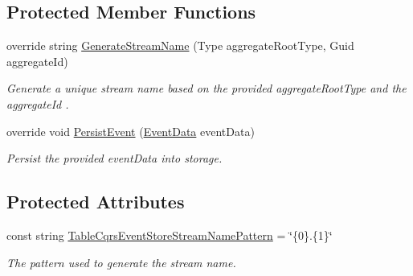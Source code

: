 \subsection*{Protected Member Functions}
\begin{DoxyCompactItemize}
\item 
override string \hyperlink{classCqrs_1_1Azure_1_1BlobStorage_1_1Events_1_1TableStorageEventStore_a5cee1f388c1a03d9cfea5ee1a9f42657_a5cee1f388c1a03d9cfea5ee1a9f42657}{Generate\+Stream\+Name} (Type aggregate\+Root\+Type, Guid aggregate\+Id)
\begin{DoxyCompactList}\small\item\em Generate a unique stream name based on the provided {\itshape aggregate\+Root\+Type}  and the {\itshape aggregate\+Id} . \end{DoxyCompactList}\item 
override void \hyperlink{classCqrs_1_1Azure_1_1BlobStorage_1_1Events_1_1TableStorageEventStore_ae63921d0ace265b1b269c865080b5712_ae63921d0ace265b1b269c865080b5712}{Persist\+Event} (\hyperlink{classCqrs_1_1Events_1_1EventData}{Event\+Data} event\+Data)
\begin{DoxyCompactList}\small\item\em Persist the provided {\itshape event\+Data}  into storage. \end{DoxyCompactList}\end{DoxyCompactItemize}
\subsection*{Protected Attributes}
\begin{DoxyCompactItemize}
\item 
const string \hyperlink{classCqrs_1_1Azure_1_1BlobStorage_1_1Events_1_1TableStorageEventStore_a6e64df5250bd136250259e0a573097e4_a6e64df5250bd136250259e0a573097e4}{Table\+Cqrs\+Event\+Store\+Stream\+Name\+Pattern} = \char`\"{}\{0\}.\{1\}\char`\"{}
\begin{DoxyCompactList}\small\item\em The pattern used to generate the stream name. \end{DoxyCompactList}\end{DoxyCompactItemize}
